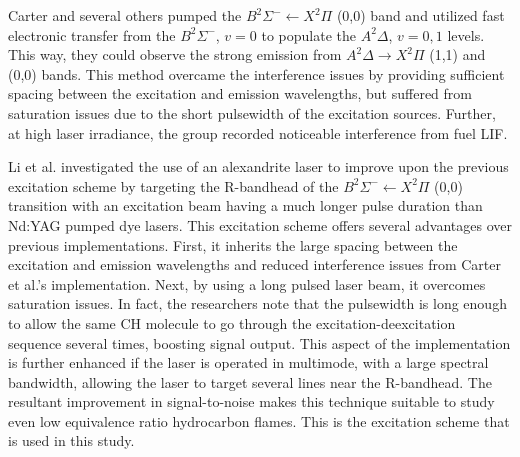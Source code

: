 Carter and several others\cite{1998-carter,1999-watson,2000-watson,2000-donbar,2000-han,2002-kothnur,2003-han-a,2003-han-b,2003-sutton} pumped the \(B^2\Sigma^-\leftarrow X^2\Pi\) (0,0) band and utilized fast electronic transfer from the \(B^2\Sigma^-\), \(v=0\) to populate the \(A^2\Delta\), \(v=0,1\) levels.
This way, they could observe the strong emission from \(A^2\Delta\rightarrow X^2\Pi\) (1,1) and (0,0) bands.
This method overcame the interference issues by providing sufficient spacing between the excitation and emission wavelengths, but suffered from saturation issues due to the short pulsewidth of the excitation sources.
Further, at high laser irradiance, the group recorded noticeable interference from fuel LIF.

Li et al.\cite{2007-li-a,2007-li-b,2007-kiefer} investigated the use of an alexandrite laser\cite{2004-li} to improve upon the previous excitation scheme by targeting the R-bandhead of the \(B^2\Sigma^-\leftarrow X^2\Pi\) (0,0) transition with an excitation beam having a much longer pulse duration than Nd:YAG pumped dye lasers.
This excitation scheme offers several advantages over previous implementations.
First, it inherits the large spacing between the excitation and emission wavelengths and reduced interference issues from Carter et al.'s implementation.
Next, by using a long pulsed laser beam, it overcomes saturation issues.
In fact, the researchers note that the pulsewidth is long enough to allow the same CH molecule to go through the excitation-deexcitation sequence several times, boosting signal output.
This aspect of the implementation is further enhanced if the laser is operated in multimode, with a large spectral bandwidth, allowing the laser to target several lines near the R-bandhead.
The resultant improvement in signal-to-noise makes this technique suitable to study even low equivalence ratio hydrocarbon flames.
This is the excitation scheme that is used in this study.

